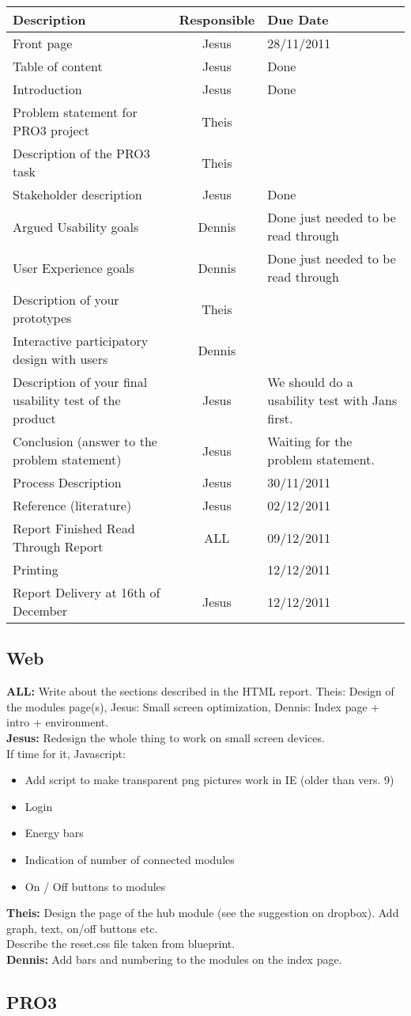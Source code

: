 \documentclass[10pt,a4paper]{article}
\begin{document}
\begin{tabular}{ | p{8cm} | c | p{5cm} |}
\hline
Description & Responsible & Due Date \\ \hline
Front page & Jesus & 28/11/2011\\ \hline
Table of content & Jesus & Done \\ \hline
Introduction & Jesus & Done\\ \hline
Problem statement for PRO3 project & Theis & \\ \hline
Description of the PRO3 task & Theis & \\ \hline
Stakeholder description & Jesus  & Done\\ \hline
Argued Usability goals & Dennis & Done just needed to be read through\\ \hline
User Experience goals &  Dennis  & Done just needed to be read through\\ \hline
Description of your prototypes & Theis & \\ \hline
Interactive participatory design with users & Dennis  & \\ \hline
Description of your final usability test of the product & Jesus & We should do a usability test with Jans first. \\ \hline
Conclusion (answer to the problem statement) & Jesus  & Waiting for the problem statement.\\ \hline
Process Description & Jesus & 30/11/2011\\ \hline
Reference (literature) & Jesus  &  02/12/2011\\ \hline
Report Finished Read Through Report & ALL & 09/12/2011\\ \hline
Printing &  & 12/12/2011\\ \hline
Report Delivery at 16th of December & Jesus & 12/12/2011 \\ \hline
\hline
\end{tabular}

\subsection{Web}
\textbf{ALL:} Write about the sections described in the HTML report. Theis: Design of the modules page(s), Jesus: Small screen optimization, Dennis: Index page + intro + environment.
\\ \textbf{Jesus:} Redesign the whole thing to work on small screen devices.
\\If time for it, Javascript: 
\begin{itemize}
	\item Add script to make transparent png pictures work in IE (older than vers. 9)
	\item Login
	\item Energy bars
	\item Indication of number of connected modules
	\item On / Off buttons to modules
\end{itemize}
\textbf{Theis:}
Design the page of the hub module (see the suggestion on dropbox). Add graph, text, on/off buttons etc.
\\Describe the reset.css file taken from blueprint.
\\\textbf{Dennis:}
Add bars and numbering to the modules on the index page.
\subsection{PRO3}
\end{document}
